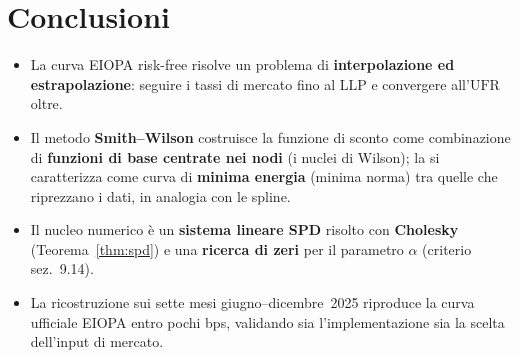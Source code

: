 \documentclass[11pt,a4paper]{article}
\theoremstyle{plain}
\theoremstyle{definition}
\theoremstyle{remark}
\newcommand{\UFR}{\ensuremath{\mathrm{UFR}}}
\newcommand{\LLP}{\ensuremath{\mathrm{LLP}}}
\begin{document}
\section{Conclusioni}

\begin{itemize}
  \item La curva EIOPA risk-free risolve un problema di \textbf{interpolazione ed
        estrapolazione}: seguire i tassi di mercato fino al $\LLP$ e convergere all'$\UFR$ oltre.
  \item Il metodo \textbf{Smith--Wilson} costruisce la funzione di sconto come combinazione di
        \textbf{funzioni di base centrate nei nodi} (i nuclei di Wilson); la si caratterizza come curva di \textbf{minima energia}
        (minima norma) tra quelle che riprezzano i dati, in analogia con le spline.
  \item Il nucleo numerico \`e un \textbf{sistema lineare SPD} risolto con \textbf{Cholesky}
        (Teorema~\ref{thm:spd}) e una \textbf{ricerca di zeri} per il parametro $\alpha$
        (criterio sez.~9.14).
  \item La ricostruzione sui sette mesi giugno--dicembre~2025 riproduce la curva ufficiale EIOPA
        entro pochi bps, validando sia l'implementazione sia la scelta dell'input di mercato.
\end{itemize}
\end{document}
